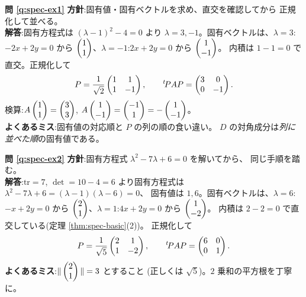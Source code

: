 \bigskip
\noindent\textbf{問 \ref{q:spec-ex1}}\quad
\textbf{方針}:固有値・固有ベクトルを求め、直交を確認してから
正規化して並べる。\\
\textbf{解答}:固有方程式は $(\lambda - 1)^2 - 4 = 0$ より
$\lambda = 3, -1$。固有ベクトルは、$\lambda = 3$:$-2x + 2y = 0$ から
$\begin{pmatrix}1 \\ 1\end{pmatrix}$、$\lambda = -1$:$2x + 2y = 0$ から $\begin{pmatrix}1 \\ -1\end{pmatrix}$。
内積は $1 - 1 = 0$ で直交。正規化して
\[
P = \frac{1}{\sqrt{2}}\begin{pmatrix}1 & 1 \\ 1 & -1\end{pmatrix}, \qquad
{}^t\!PAP = \begin{pmatrix}3 & 0 \\ 0 & -1\end{pmatrix}.
\]
検算:$A\begin{pmatrix}1 \\ 1\end{pmatrix} = \begin{pmatrix}3 \\ 3\end{pmatrix}$,
$A\begin{pmatrix}1 \\ -1\end{pmatrix} = \begin{pmatrix}-1 \\ 1\end{pmatrix} = -\begin{pmatrix}1 \\ -1\end{pmatrix}$。\\
\textbf{よくあるミス}:固有値の対応順と $P$ の列の順の食い違い。
$D$ の対角成分は\emph{列に並べた順}の固有値である。

\bigskip
\noindent\textbf{問 \ref{q:spec-ex2}}\quad
\textbf{方針}:固有方程式 $\lambda^2 - 7\lambda + 6 = 0$ を解いてから、
同じ手順を踏む。\\
\textbf{解答}:$\mathrm{tr} = 7$, $\det = 10 - 4 = 6$ より固有方程式は
$\lambda^2 - 7\lambda + 6 = (\lambda - 1)(\lambda - 6) = 0$、
固有値は $1, 6$。固有ベクトルは、$\lambda = 6$:$-x + 2y = 0$ から
$\begin{pmatrix}2 \\ 1\end{pmatrix}$、$\lambda = 1$:$4x + 2y = 0$ から $\begin{pmatrix}1 \\ -2\end{pmatrix}$。
内積は $2 - 2 = 0$ で直交している(定理 \ref{thm:spec-basic}(2))。
正規化して
\[
P = \frac{1}{\sqrt{5}}\begin{pmatrix}2 & 1 \\ 1 & -2\end{pmatrix}, \qquad
{}^t\!PAP = \begin{pmatrix}6 & 0 \\ 0 & 1\end{pmatrix}.
\]
\textbf{よくあるミス}:$\|\begin{pmatrix}2 \\ 1\end{pmatrix}\| = 3$ とすること
(正しくは $\sqrt{5}$)。$2$ 乗和の平方根を丁寧に。

